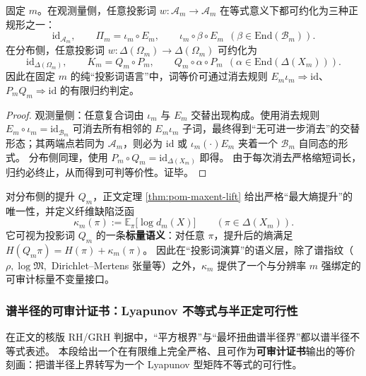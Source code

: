 \begin{proposition}[投影词正规形与可判等价]\label{prop:projection-word-normal-form}
固定 \(m\)。在观测量侧，任意投影词 \(w:\mathcal{A}_m\to\mathcal{A}_m\) 在等式意义下都可约化为三种正规形之一：
\[
\mathrm{id}_{\mathcal{A}_m},\qquad
\Pi_m=\iota_m\circ E_m,\qquad
\iota_m\circ \beta\circ E_m\ \ (\beta\in\mathrm{End}(\mathcal{B}_m)).
\]
在分布侧，任意投影词 \(w:\Delta(\Omega_m)\to\Delta(\Omega_m)\) 可约化为
\[
\mathrm{id}_{\Delta(\Omega_m)},\qquad
K_m=Q_m\circ P_m,\qquad
Q_m\circ \alpha\circ P_m\ \ (\alpha\in\mathrm{End}(\Delta(X_m))).
\]
因此在固定 \(m\) 的纯“投影词语言”中，词等价可通过消去规则 \(E_m\iota_m\Rightarrow \mathrm{id}\)、\(P_mQ_m\Rightarrow \mathrm{id}\) 的有限归约判定。
\end{proposition}
\begin{proof}
观测量侧：任意复合词由 \(\iota_m\) 与 \(E_m\) 交替出现构成。使用消去规则 \(E_m\circ\iota_m=\mathrm{id}_{\mathcal{B}_m}\) 可消去所有相邻的 \(E_m\iota_m\) 子词，最终得到“无可进一步消去”的交替形态；其两端点若同为 \(\mathcal{A}_m\)，则必为 \(\mathrm{id}\) 或 \(\iota_m(\cdot)E_m\) 夹着一个 \(\mathcal{B}_m\) 自同态的形式。
分布侧同理，使用 \(P_m\circ Q_m=\mathrm{id}_{\Delta(X_m)}\) 即得。
由于每次消去严格缩短词长，归约必终止，从而得到可判等价性。证毕。
\end{proof}

\begin{remark}[熵增作为投影词的标量语义]\label{rem:projection-word-entropy-defect}
对分布侧的提升 \(Q_m\)，正文定理 \ref{thm:pom-maxent-lift} 给出严格“最大熵提升”的唯一性，并定义纤维缺陷泛函
\[
\kappa_m(\pi):=\mathbb{E}_{\pi}\bigl[\log d_m(X)\bigr]\qquad(\pi\in\Delta(X_m)).
\]
它可视为投影词 \(Q_m\) 的一条\textbf{标量语义}：对任意 \(\pi\)，提升后的熵满足
\(
H(Q_m\pi)=H(\pi)+\kappa_m(\pi)
\)。
因此在“投影词演算”的语义层，除了谱指纹（\(\rho,\log\mathfrak{M},\) Dirichlet--Mertens 张量等）之外，\(\kappa_m\) 提供了一个与分辨率 \(m\) 强绑定的可审计标量不变量接口。
\end{remark}

\subsubsection{谱半径的可审计证书：Lyapunov 不等式与半正定可行性}\label{app:op-algebra-lyapunov}
在正文的核版 RH/GRH 判据中，“平方根界”与“最坏扭曲谱半径界”都以谱半径不等式表述。
本段给出一个在有限维上完全严格、且可作为\textbf{可审计证书}输出的等价刻画：把谱半径上界转写为一个 Lyapunov 型矩阵不等式的可行性。

